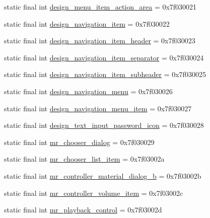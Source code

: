 \begin{CompactItemize}
static final int \hyperlink{classandroid_1_1support_1_1v7_1_1palette_1_1_r_1_1layout_be5b6533d462905233edec16bd7b2c90}{design\_\-menu\_\-item\_\-action\_\-area} = 0x7f030021
\item 
static final int \hyperlink{classandroid_1_1support_1_1v7_1_1palette_1_1_r_1_1layout_b18f322247152051cdbba1e69304ca2a}{design\_\-navigation\_\-item} = 0x7f030022
\item 
static final int \hyperlink{classandroid_1_1support_1_1v7_1_1palette_1_1_r_1_1layout_f335688107d96af635a60342e4dd58d1}{design\_\-navigation\_\-item\_\-header} = 0x7f030023
\item 
static final int \hyperlink{classandroid_1_1support_1_1v7_1_1palette_1_1_r_1_1layout_00335b45910644546a75c65b17f99115}{design\_\-navigation\_\-item\_\-separator} = 0x7f030024
\item 
static final int \hyperlink{classandroid_1_1support_1_1v7_1_1palette_1_1_r_1_1layout_cd8698d8236bb3f6baa29b7620377dfa}{design\_\-navigation\_\-item\_\-subheader} = 0x7f030025
\item 
static final int \hyperlink{classandroid_1_1support_1_1v7_1_1palette_1_1_r_1_1layout_c145a8557b7dbbd021058ab15f881770}{design\_\-navigation\_\-menu} = 0x7f030026
\item 
static final int \hyperlink{classandroid_1_1support_1_1v7_1_1palette_1_1_r_1_1layout_5dfbe9ce18842ecf72c6701c0ba7a418}{design\_\-navigation\_\-menu\_\-item} = 0x7f030027
\item 
static final int \hyperlink{classandroid_1_1support_1_1v7_1_1palette_1_1_r_1_1layout_5a3f839c02d8c4efa6f78bcb3fd53667}{design\_\-text\_\-input\_\-password\_\-icon} = 0x7f030028
\item 
static final int \hyperlink{classandroid_1_1support_1_1v7_1_1palette_1_1_r_1_1layout_aa459656382a36ee928506b4d0b78f00}{mr\_\-chooser\_\-dialog} = 0x7f030029
\item 
static final int \hyperlink{classandroid_1_1support_1_1v7_1_1palette_1_1_r_1_1layout_e66d257e027ff6fd4b1d1fe25648be83}{mr\_\-chooser\_\-list\_\-item} = 0x7f03002a
\item 
static final int \hyperlink{classandroid_1_1support_1_1v7_1_1palette_1_1_r_1_1layout_a5adc67972242bc71a892ad099242dfd}{mr\_\-controller\_\-material\_\-dialog\_\-b} = 0x7f03002b
\item 
static final int \hyperlink{classandroid_1_1support_1_1v7_1_1palette_1_1_r_1_1layout_684dc808d56b489462ef81327fdc8f33}{mr\_\-controller\_\-volume\_\-item} = 0x7f03002c
\item 
static final int \hyperlink{classandroid_1_1support_1_1v7_1_1palette_1_1_r_1_1layout_c464e70756c836a950bce35a77a31f4f}{mr\_\-playback\_\-control} = 0x7f03002d

\end{CompactItemize}
